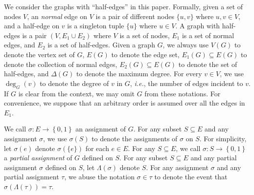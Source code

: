 \documentclass[11pt]{article}
\newcommand{\set}[1]{\left\{#1\right\}}
\def\!#1{\mathtt{#1}}
\def\IE{\emph{i.e.}}
\newcommand{\Par}{\!{Par}}
\newcommand{\qtodo}[1]{\todo[color = purple!40, size = \tiny]{\textbf{guoliang:} #1}}
\newcommand{\qgl}[1]{{\color{purple}{#1}}}
\newcommand{\hktodo}[1]{{\color{blue}{#1}}}
\begin{document}
We consider the graphs with ``half-edges'' in this paper.
Formally, given a set of nodes $V$, an \emph{normal} edge on $V$ is a pair of different nodes $\{u,v\}$ where $u,v\in V$,
and a half-edge on $v$ is a singleton tuple $\{u\}$ where $u \in V$.
A graph with half-edges is a pair $(V,E_1\cup E_2)$ where $V$ is a set of nodes, $E_1$ is a set of normal edges,
and $E_2$ is a set of half-edges. 
\qgl{To distinguish the graph with no half-edges, we will consistently refer to the graph with half-edges as $G=\left(V,E=E_1\cup E_2\right)$. One can verify that the notations $\mu_\Phi$, $Z_\Phi$, e.t.c., can be generalized to the instances where the graph has half edges.}
Given a graph $G$, we always use $V(G)$ to denote the vertex set of $G$, $E(G)$ to denote the edge set, $E_1(G) \subseteq E(G)$ to denote the collection of normal edges, $E_2(G)\subseteq E(G)$ to denote the set of half-edges, and $\Delta(G)$ to denote the maximum degree. 
For every $v \in V$, we use $\deg_G(v)$ to denote the degree of $v$ in $G$, \IE, the number of edges incident to $v$.
If $G$ is clear from the context, we may omit $G$ from these notations.
For convenience, we suppose that an arbitrary order is assumed over all the edges in $E_1$.


We call $\sigma: E\rightarrow \set{0,1}$ an assignment of $G$.
For any subset $S\subseteq E$ and any assignment $\sigma$, we use $\sigma(S)$ to denote the assignments of $\sigma$ on $S$.
For simplicity, let $\sigma(e)$ denote $\sigma(\{e\})$ for each $e\in E$. For any $S\subseteq E$, we call $\sigma: S\rightarrow \set{0,1}$ a \emph{partial assignment} of $G$ defined on $S$.
For any subset $S \subseteq E$ and any partial assignment $\sigma$ defined on $S$, 
let $\Lambda(\sigma)$ denote $S$.
For any assignment $\sigma$ and any partial assignment $\tau$,
we abuse the notation $\sigma\in \tau$ to denote the event that $\sigma(\Lambda(\tau)) =\tau$.
\end{document}
